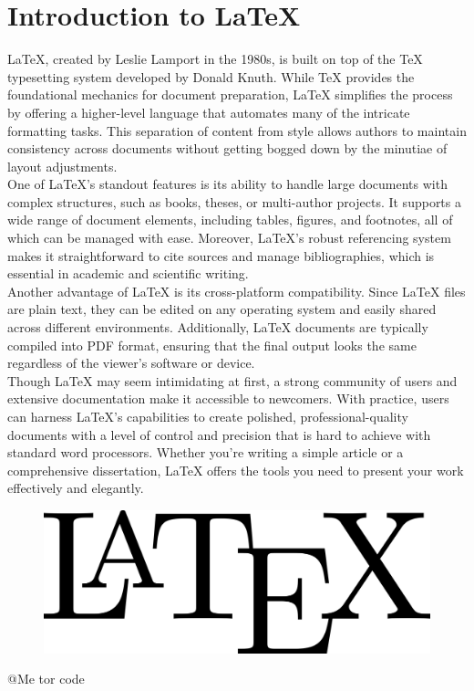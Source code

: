 \documentclass[12pt, a4paper]{article}
\begin{document}
\section*{Introduction to LaTeX}
\vspace{2cm}
LaTeX, created by Leslie Lamport in the 1980s, is built on top of the TeX typesetting system developed by Donald Knuth. While TeX provides the foundational mechanics for document preparation, LaTeX simplifies the process by offering a higher-level language that automates many of the intricate formatting tasks. This separation of content from style allows authors to maintain consistency across documents without getting bogged down by the minutiae of layout adjustments. \\
\vspace{0.3cm}
One of LaTeX's standout features is its ability to handle large documents with complex structures, such as books, theses, or multi-author projects. It supports a wide range of document elements, including tables, figures, and footnotes, all of which can be managed with ease. Moreover, LaTeX's robust referencing system makes it straightforward to cite sources and manage bibliographies, which is essential in academic and scientific writing.\\
\vspace{0.3cm}
Another advantage of LaTeX is its cross-platform compatibility. Since LaTeX files are plain text, they can be edited on any operating system and easily shared across different environments. Additionally, LaTeX documents are typically compiled into PDF format, ensuring that the final output looks the same regardless of the viewer's software or device.\\
\vspace{0.3cm}
Though LaTeX may seem intimidating at first, a strong community of users and extensive documentation make it accessible to newcomers. With practice, users can harness LaTeX's capabilities to create polished, professional-quality documents with a level of control and precision that is hard to achieve with standard word processors. Whether you're writing a simple article or a comprehensive dissertation, LaTeX offers the tools you need to present your work effectively and elegantly.

\begin{figure}
    \centering
    \includegraphics[width=0.3\linewidth]{latex.png}
\end{figure}
@Me tor code
\end{document}
